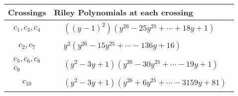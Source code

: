 \documentclass[1p]{elsarticle_modified}
\theoremstyle{definition}
\begin{document}
\begin{tabular}{m{50pt}|m{274pt}}
Crossings & \hspace{64pt}Riley Polynomials at each crossing \\
\hline $$\begin{aligned}c_{1},c_{3},c_{4}\end{aligned}$$&$\begin{aligned}
&((y-1)^2)(y^{26}-25 y^{25}+\cdots+18 y+1)
\end{aligned}$\\
\hline $$\begin{aligned}c_{2},c_{7}\end{aligned}$$&$\begin{aligned}
&y^2(y^{26}-15 y^{25}+\cdots-136 y+16)
\end{aligned}$\\
\hline $$\begin{aligned}c_{5},c_{6},c_{8}\\c_{9}\end{aligned}$$&$\begin{aligned}
&(y^2-3 y+1)(y^{26}-30 y^{25}+\cdots-19 y+1)
\end{aligned}$\\
\hline $$\begin{aligned}c_{10}\end{aligned}$$&$\begin{aligned}
&(y^2-3 y+1)(y^{26}+6 y^{25}+\cdots-3159 y+81)
\end{aligned}$\\
\hline
\end{tabular}
\vskip 2pc
\end{document}
